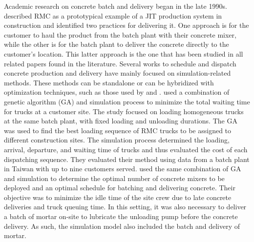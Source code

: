 \documentclass[authoryear,preprint,review,11pt]{elsarticle}
\begin{document}
Academic research on concrete batch and delivery began in the late 1990s. \cite{tommelein1999just} described RMC as a prototypical example of a JIT production system in construction and identified two practices for delivering it. One approach is for the customer to haul the product from the batch plant with their concrete mixer, while the other is for the batch plant to deliver the concrete directly to the customer's location. This latter approach is the one that has been studied in all related papers found in the literature. Several works to schedule and dispatch concrete production and delivery have mainly focused on simulation-related methods. These methods can be standalone \citep{zayed2001simulation} or can be hybridized with optimization techniques, such as those used by \cite{feng2004optimizing} and \cite{lu2005optimized}. \cite{feng2004optimizing} used a combination of genetic algorithm (GA) and simulation process to minimize the total waiting time for trucks at a customer site. The study focused on loading homogeneous trucks at the same batch plant, with fixed loading and unloading durations. The GA was used to find the best loading sequence of RMC trucks to be assigned to different construction sites. The simulation process determined the loading, arrival, departure, and waiting time of trucks and thus evaluated the cost of each dispatching sequence. They evaluated their method using data from a batch plant in Taiwan with up to nine customers served. \cite{lu2005optimized} used the same combination of GA and simulation to determine the optimal number of concrete mixers to be deployed and an optimal schedule for batching and delivering concrete. Their objective was to minimize the idle time of the site crew due to late concrete deliveries and truck queuing time. In this setting, it was also necessary to deliver a batch of mortar on-site to lubricate the unloading pump before the concrete delivery. As such, the simulation model also included the batch and delivery of mortar.
\end{document}

